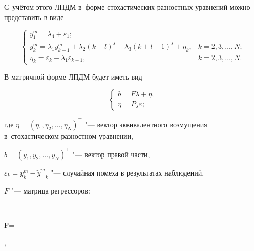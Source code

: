 С~учётом этого ЛПДМ в~форме стохастических разностных уравнений можно представить в виде

\begin{equation}\label{a:eq12_1}

 \left\{\begin{array}{ll}

 y^m_1=\lambda_4 +\varepsilon_1 ;\\

  y^m_k=\lambda_1{y^m_{k-1}}+\lambda_2 (k+l)^s +\lambda_3(k+l-1)^s +\eta_k , & k=2, 3, \dots,N ;\\

 \eta_k=\varepsilon_k-\lambda_1{\varepsilon_{k-1}} , & k=2, 3, \dots,N .	

 \end{array}\right.

\end{equation}

В матричной форме ЛПДМ будет иметь вид 

$$

\left\{\begin{array}{l}

b=F\lambda+\eta,\\

\eta=P_{\lambda}\varepsilon;

\end{array}\right.

$$

где $\eta=(\eta_1, \eta_2, \dots, \eta_N)^\top $ "--- вектор эквивалентного возмущения в~стохастическом разностном уравнении,

$b=(y_1, y_2, \dots, y_N)^\top $ "--- вектор правой части,

$\varepsilon_k=y^m_k-{\tilde{y}^m}_k$ "--- случайная помеха в результатах наблюдений,

$F$ "---  матрица регрессоров:

$$ 

F=

 ,

